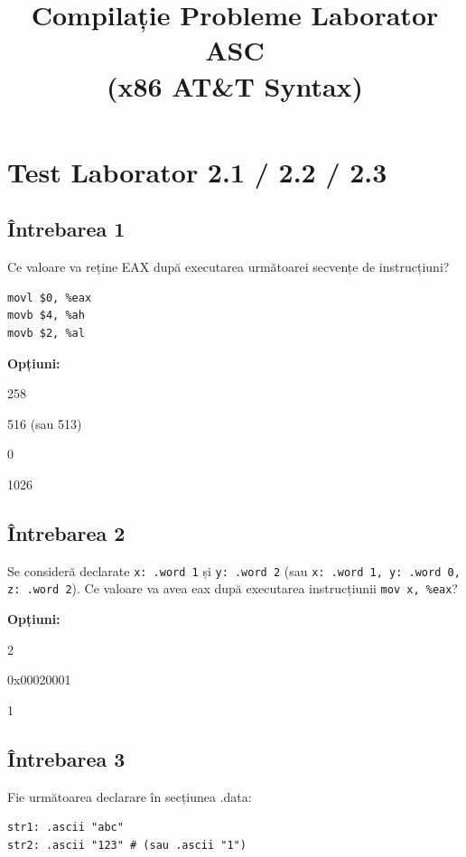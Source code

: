 \documentclass[12pt,a4paper]{article}
\title{Compilație Probleme Laborator ASC \\ (x86 AT\&T Syntax)}
\author{}
\date{}
\begin{document}
\maketitle
\tableofcontents
\newpage


\section{Test Laborator 2.1 / 2.2 / 2.3}

\subsection*{Întrebarea 1}
Ce valoare va reține EAX după executarea următoarei secvențe de instrucțiuni?

\begin{lstlisting}[language=x86asm]
movl $0, %eax
movb $4, %ah
movb $2, %al
\end{lstlisting}

\textbf{Opțiuni:}
\begin{itemize*}
    \item 258
    \item 516 (sau 513)
    \item 0
    \item 1026
\end{itemize*}

\subsection*{Întrebarea 2}
Se consideră declarate \texttt{x: .word 1} și \texttt{y: .word 2} (sau \texttt{x: .word 1, y: .word 0, z: .word 2}). Ce valoare va avea eax după executarea instrucțiunii \texttt{mov x, \%eax}?

\textbf{Opțiuni:}
\begin{itemize*}
    \item 2
    \item 0x00020001
    \item 1 
\end{itemize*}

\subsection*{Întrebarea 3}
Fie următoarea declarare în secțiunea .data:
\begin{lstlisting}[language=x86asm]
str1: .ascii "abc"
str2: .ascii "123" # (sau .ascii "1")
\end{lstlisting}
\end{document}
